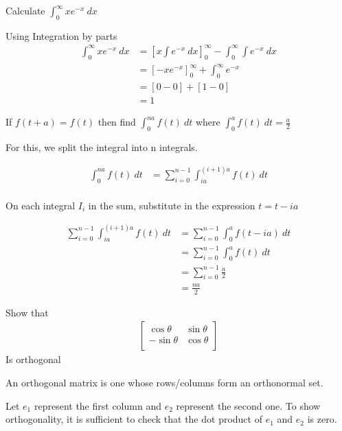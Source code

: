 \documentclass[a4paper]{article}
\begin{document}
\begin{question}
	Calculate \(\int_{0}^{\infty} xe^{-x}\ dx\)
\end{question}

Using Integration by parts
\begin{align*}
	\int_{0}^{\infty} xe^{-x}\ dx &= \left[x \int e^{-x}\ dx\right]_{0}^{\infty} - \int_{0}^{\infty} \int e^{-x}\ dx \\
	&= \left[-xe^{-x}\right]_{0}^{\infty} + \int_{0}^{\infty} e^{-x} \\
	&= [0 - 0] + [1 - 0] \\
	&= 1 
\end{align*}

\begin{question}
	If \(f(t+a) = f(t)\) then find \(\int_{0}^{na} f(t)\ dt\) where \(\int_{0}^{a} f(t)\ dt = \frac{a}{2}\)
\end{question}

For this, we split the integral into n integrals.

\begin{align*}
	\int_{0}^{na} f(t)\ dt &= \sum_{i=0}^{n-1} \int_{ia}^{(i+1)a} f(t)\ dt \\
\end{align*}

On each integral \(I_i\) in the sum, substitute in the expression \(t = t - ia\)

\begin{align*}
	\sum_{i=0}^{n-1} \int_{ia}^{(i+1)a} f(t)\ dt &= \sum_{i=0}^{n-1} \int_{0}^{a} f(t-ia)\ dt \\
	 &= \sum_{i=0}^{n-1} \int_{0}^{a} f(t)\ dt \\
	 &= \sum_{i=0}^{n-1} \frac{a}{2} \\
	 &= \frac{na}{2}
\end{align*}

\begin{question}
	Show that
	\begin{align*}
		\left[
			\begin{matrix}
				\cos\theta & \sin\theta \\
				-\sin\theta & \cos\theta \\
			\end{matrix}
		\right]
	\end{align*}
	Is orthogonal
\end{question}

An orthogonal matrix is one whose rows/columns form an orthonormal set.

Let \(e_1\) represent the first column and \(e_2\) represent the second one. To show orthogonality, it is sufficient to check that the dot product of \(e_1\) and \(e_2\) is zero.
\end{document}
